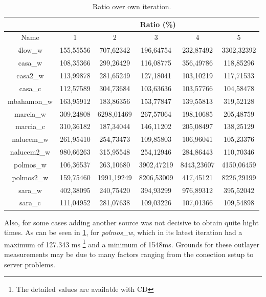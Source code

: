 \begin{table}[!ht]
\begin{center}
\begin{tabular}{|c||c|c|c|c|c||}
 \hline
 & \multicolumn{5}{|c|}{ Ratio (\%)} \\ \hline
Name 		& 1			& 2			 & 3	        & 4				& 5 			\\ \hline \hline
4low\_w		& 155,55556	& 707,62342	 & 196,64754	& 232,87492		& 3302,32392	\\ \hline
casa\_w		& 108,35366	& 299,26429	 & 116,08775	& 356,49786		& 118,85296 	\\ \hline
casa2\_w	& 113,99878	& 281,65249	 & 127,18041	& 103,10219		& 117,71533 	\\ \hline
casa\_c		& 112,57589	& 304,73684	 & 103,63636	& 103,57766		& 104,58478 	\\ \hline
mbahamon\_w	& 163,95912	& 183,86356	 & 153,77847	& 139,55813		& 319,52128 	\\ \hline
marcia\_w	& 309,24808	& 6298,01469 & 267,57064	& 198,10685		& 205,48759 	\\ \hline
marcia\_c	& 310,36182	& 187,34044	 & 146,11202	& 205,08497		& 138,25129 	\\ \hline
nalucem\_w	& 261,95410	& 254,73473	 & 109,85803	& 106,96041		& 105,23376 	\\ \hline
nalucem2\_w	& 980,66263	& 315,95548	 & 254,12946	& 284,86443		& 110,70346 	\\ \hline
polmos\_w	& 106,36537	& 263,10680	 & 3902,47219	& 8443,23607	& 4150,06459 	\\ \hline
polmos2\_w	& 159,75460	& 1991,19249 & 8206,53009	& 417,45121		& 8226,29199 	\\ \hline
sara\_w		& 402,38095	& 240,75420	 & 394,93299	& 976,89312		& 395,52042 	\\ \hline
sara\_c		& 111,04952	& 281,07638	 & 109,03226	& 107,01366		& 109,54898 	\\ \hline
\end{tabular}
\caption[Page Benchmark: Ratio over own iteration]{Ratio over own iteration.}
\label{table:variationratio}
\end{center}
\end{table}

Also, for some cases adding another source was not decisive to obtain quite hight times. As can be seen in \ref{table:variationratio}, for
\emph{polmos\_w}, which in its latest iteration had a maximum of 127.343 ms
\footnote{The detailed values are available with CD} and a minimum of 1548ms.
Grounds for these outlayer measurements may be due to many factors ranging
from the conection setup to server problems.
